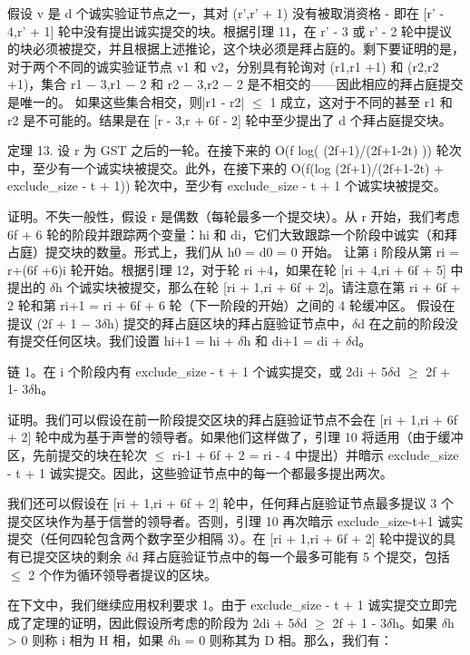 假设 v 是 d 个诚实验证节点之一，其对 (r',r' + 1) 没有被取消资格 - 即在 [r' - 4,r' + 1] 轮中没有提出诚实提交的块。根据引理 11，在 r' - 3 或 r' - 2 轮中提议的块必须被提交，并且根据上述推论，这个块必须是拜占庭的。剩下要证明的是，对于两个不同的诚实验证节点 v1 和 v2，分别具有轮询对 (r1,r1 +1) 和 (r2,r2 +1)，集合 {r1 − 3,r1 − 2} 和​​ {r2 − 3,r2 − 2} 是不相交的——因此相应的拜占庭提交是唯一的。 如果这些集合相交，则|r1 - r2| $\leq$ 1 成立，这对于不同的甚至 r1 和 r2 是不可能的。结果是在 [r - 3,r + 6f - 2] 轮中至少提出了 d 个拜占庭提交块。

定理 13. 设 r 为 GST 之后的一轮。在接下来的 O(f log( (2f+1)/(2f+1-2t) )) 轮次中，至少有一个诚实块被提交。此外，在接下来的 O(f(log (2f+1)/(2f+1-2t) + exclude\_size - t + 1)) 轮次中，至少有 exclude\_size - t + 1 个诚实块被提交。

证明。不失一般性，假设 r 是偶数（每轮最多一个提交块）。从 r 开始，我们考虑 6f + 6 轮的阶段并跟踪两个变量：hi 和 di，它们大致跟踪一个阶段中诚实（和拜占庭）提交块的数量。形式上，我们从 h0 = d0 = 0 开始。
让第 i 阶段从第 ri = r+(6f +6)i 轮开始。根据引理 12，对于轮 ri +4，如果在轮 [ri + 4,ri + 6f + 5] 中提出的 $\delta$h 个诚实块被提交，那么在轮 [ri + 1,ri + 6f + 2]。请注意在第 ri + 6f + 2 轮和第 ri+1 = ri + 6f + 6 轮（下一阶段的开始）之间的 4 轮缓冲区。
假设在提议 (2f + 1 − 3$\delta$h) 提交的拜占庭区块的拜占庭验证节点中，$\delta$d 在之前的阶段没有提交任何区块。我们设置 hi+1 = hi + $\delta$h 和 di+1 = di + $\delta$d。

链 1。在 i 个阶段内有 exclude\_size - t + 1 个诚实提交，或 2di + 5$\delta$d $\geq$ 2f + 1- 3$\delta$h。

证明。我们可以假设在前一阶段提交区块的拜占庭验证节点不会在 [ri + 1,ri + 6f + 2] 轮中成为基于声誉的领导者。如果他们这样做了，引理 10 将适用（由于缓冲区，先前提交的块在轮次 $\leq$ ri-1 + 6f + 2 = ri - 4 中提出）并暗示 exclude\_size - t + 1 诚实提交。因此，这些验证节点中的每一个都最多提出两次。

我们还可以假设在 [ri + 1,ri + 6f + 2] 轮中，任何拜占庭验证节点最多提议 3 个提交区块作为基于信誉的领导者。否则，引理 10 再次暗示 exclude\_size-t+1 诚实提交（任何四轮包含两个数字至少相隔 3）。在 [ri + 1,ri + 6f + 2] 轮中提议的具有已提交区块的剩余 $\delta$d 拜占庭验证节点中的每一个最多可能有 5 个提交，包括 $\leq$ 2 个作为循环领导者提议的区块。

在下文中，我们继续应用权利要求 1。由于 exclude\_size - t + 1 诚实提交立即完成了定理的证明，因此假设所考虑的阶段为 2di + 5$\delta$d $\geq$ 2f + 1 - 3$\delta$h。如果 $\delta$h > 0 则称 i 相为 H 相，如果 $\delta$h = 0 则称其为 D 相。那么，我们有：


